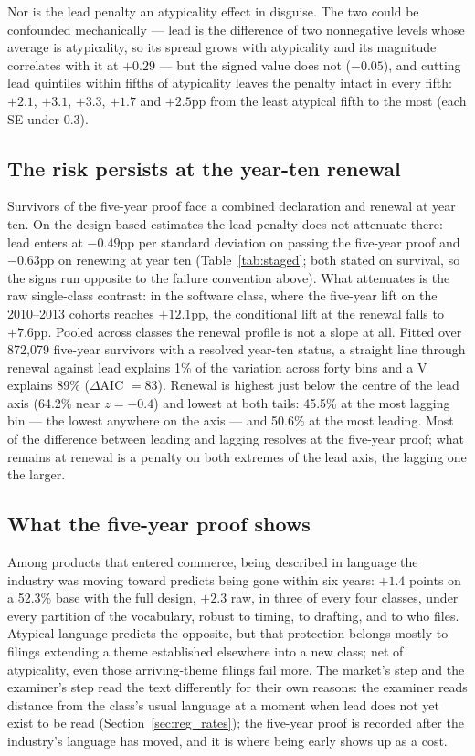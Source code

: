 Nor is the lead penalty an atypicality effect in disguise. The two could
be confounded mechanically --- lead is the difference of two nonnegative
levels whose average is atypicality, so its spread grows with atypicality
and its magnitude correlates with it at $+0.29$ --- but the signed value
does not ($-0.05$), and cutting lead quintiles within fifths of
atypicality leaves the penalty intact in every fifth: $+2.1$, $+3.1$,
$+3.3$, $+1.7$ and $+2.5$pp from the least atypical fifth to the most
(each SE under $0.3$).

\subsection{The risk persists at the year-ten renewal}\label{sec:renewal}

Survivors of the five-year proof face a combined declaration and renewal
at year ten. On the design-based estimates the lead penalty does not
attenuate there: lead enters at $-0.49$pp per standard deviation on
passing the five-year proof and $-0.63$pp on renewing at year ten
(Table~\ref{tab:staged}; both stated on survival, so the signs run
opposite to the failure convention above). What attenuates is the raw
single-class contrast: in the software class, where the five-year lift on
the 2010--2013 cohorts reaches $+12.1$pp, the conditional lift at the
renewal falls to $+7.6$pp. Pooled across classes the renewal profile is
not a slope at all. Fitted over 872{,}079 five-year survivors with a
resolved year-ten status, a straight line through renewal against lead
explains 1\% of the variation across forty bins and a V explains 89\%
($\Delta$AIC $= 83$). Renewal is highest just below the centre of the
lead axis (64.2\% near $z = -0.4$) and lowest at both tails: 45.5\% at
the most lagging bin --- the lowest anywhere on the axis --- and 50.6\%
at the most leading. Most of the difference between leading and lagging
resolves at the five-year proof; what remains at renewal is a penalty on
both extremes of the lead axis, the lagging one the larger.

\subsection{What the five-year proof shows}\label{sec:gate_conclusion}

Among products that entered commerce, being described in language the
industry was moving toward predicts being gone within six years: $+1.4$
points on a 52.3\% base with the full design, $+2.3$ raw, in three of
every four classes, under every partition of the vocabulary, robust to
timing, to drafting, and to who files. Atypical language predicts the
opposite, but that protection belongs mostly to filings extending a theme
established elsewhere into a new class; net of atypicality, even those
arriving-theme filings fail more. The market's step and the examiner's
step read the text differently for their own reasons: the examiner reads
distance from the class's usual language at a moment when lead does not
yet exist to be read (Section~\ref{sec:reg_rates}); the five-year proof is
recorded after the industry's language has moved, and it is where being
early shows up as a cost.
